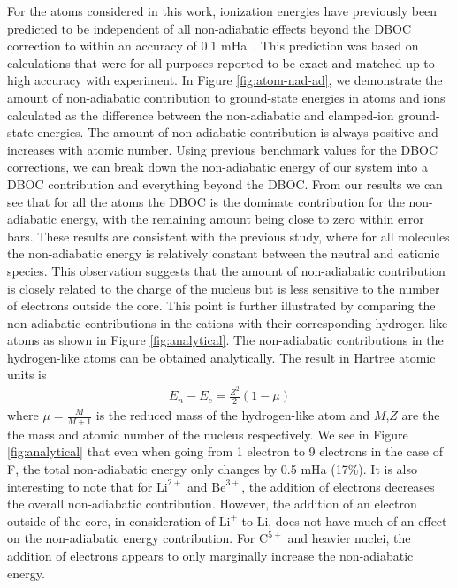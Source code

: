 \documentclass[pra,superscriptaddress,groupedaddress,twocolumn]{revtex4}
\begin{document}
For the atoms considered in this work, ionization energies have previously been predicted to be independent of all non-adiabatic effects beyond the DBOC correction to within an accuracy of 0.1 mHa~\cite{Klopper_IP}.  This prediction was based on calculations that were for all purposes reported to be exact and matched up to high accuracy with experiment. In Figure \ref{fig:atom-nad-ad}, we demonstrate the amount of non-adiabatic contribution to ground-state energies in atoms and ions calculated as the difference between the non-adiabatic and clamped-ion ground-state energies. The amount of non-adiabatic contribution is always positive and increases with atomic number.  Using previous benchmark values for the DBOC corrections, we can break down the non-adiabatic energy of our system into a DBOC contribution and everything beyond the DBOC.  From our results we can see that for all the atoms the DBOC is the dominate contribution for the non-adiabatic energy, with the remaining amount being close to zero within error bars.  These results are consistent with the previous study, where for all molecules the non-adiabatic energy is relatively constant between the neutral and cationic species. This observation suggests that the amount of non-adiabatic contribution is closely related to the charge of the nucleus but is less sensitive to the number of electrons outside the core. This point is further illustrated by comparing the non-adiabatic contributions in the cations with their corresponding hydrogen-like atoms as shown in Figure \ref{fig:analytical}. The non-adiabatic contributions in the hydrogen-like atoms can be obtained analytically. The result in Hartree atomic units is
\begin{align}
E_n-E_c=\frac{Z^2}{2}(1-\mu)
\end{align}
where $\mu=\frac{M}{M+1}$ is the reduced mass of the hydrogen-like atom and $M$,$Z$ are the the mass and atomic number of the nucleus respectively. We see in Figure \ref{fig:analytical} that even when going from 1 electron to 9 electrons in the case of F, the total non-adiabatic energy only changes by 0.5 mHa (17\%). It is also interesting to note that for $\text{Li}^{2+}$ and $\text{Be}^{3+}$, the addition of electrons decreases the overall non-adiabatic contribution.  However, the addition of an electron outside of the core, in consideration of $\text{Li}^{+}$ to Li, does not have much of an effect on the non-adiabatic energy contribution.   For $\text{C}^{5+}$ and heavier nuclei, the addition of electrons appears to only marginally increase the non-adiabatic energy.  %
\end{document}
